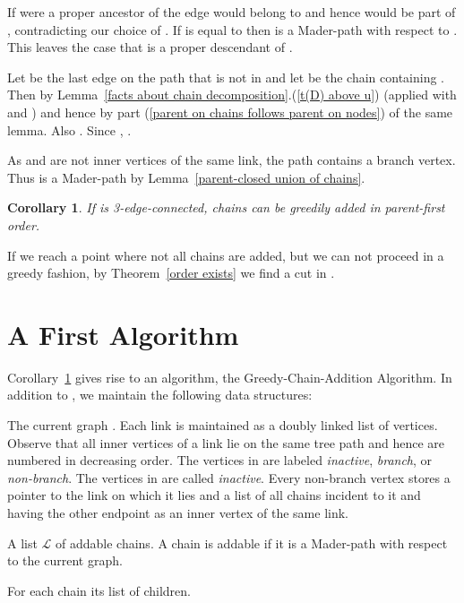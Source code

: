 \documentclass[paper=a4]{scrartcl}
\newtheorem{corollary}{Corollary}
\newcommand{\qed}{}
\newcommand{\mqed}{\hfill}
\newlength{\proofpostskipamount}\newlength{\proofpreskipamount}
\newenvironment{proof}{\par\vspace{\proofpreskipamount}\noindent{\textbf{Proof:}}\hspace{0.5em}}{\nopagebreak \strut\nopagebreak \hspace{\fill}\mqed\par\vspace{\proofpostskipamount}\noindent}
\begin{document}
\begin{proof}
If  were a proper ancestor of  the edge  would belong to  and hence  would be part of , contradicting our choice of . If  is equal to  then  is a Mader-path with respect to . This leaves the case that  is a proper descendant of .

Let  be the last edge on the path  that is not in  and let  be the chain containing . Then  by Lemma~\ref{facts about chain decomposition}.(\ref{t(D) above u}) (applied with  and ) and hence  by part (\ref{parent on chains follows parent on nodes}) of the same lemma. Also . Since , .

As  and  are not inner vertices of the same link, the path  contains a branch vertex. Thus  is a Mader-path by Lemma~\ref{parent-closed union of chains}.
\qed
\end{proof}
\begin{corollary}\label{greedy works}  If  is 3-edge-connected, chains can be greedily added in parent-first order.
\end{corollary}
\begin{proof} If we reach a point where not all chains are added, but we can not proceed in a greedy fashion, by Theorem~\ref{order exists} we find a cut in .
\end{proof}

\section{A First Algorithm}\label{A First Algorithm}

Corollary~\ref{greedy works} gives rise to an  algorithm, the Greedy-Chain-Addition Algorithm. In addition to , we maintain the following data structures:
\newcommand{\cL}{\ensuremath{\mathcal{L}}\xspace}
\begin{compactitem}
\item The current graph . Each link is maintained as a doubly linked list of vertices. Observe that all inner vertices of a link lie on the same tree path and hence are numbered in decreasing order. The vertices in  are labeled \emph{inactive}, \emph{branch}, or \emph{non-branch}. The vertices in  are called \emph{inactive}. Every non-branch vertex stores a pointer to the link on which it lies and a list of all chains incident to it and having the other endpoint as an inner vertex of the same link. \item A list \cL of addable chains. A chain is addable if it is a Mader-path with respect to the current graph.
\item For each chain its list of children.
\end{compactitem}
\end{document}

